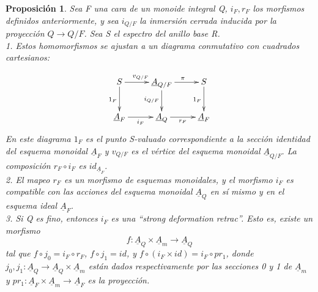 \documentclass[12pt,spanish]{amsart}
\newtheorem{prop}[Theorem]{Proposición}
\theoremstyle{definition}
\theoremstyle{remark}
\begin{document}
\begin{prop}
Sea F una cara de un monoide \textit{integral} Q, $i_{F},r_{F}$ los morfismos definidos anteriormente, y sea $i_{Q/F}$ la inmersión cerrada inducida por la proyección $Q \to Q/F$. Sea S el espectro del anillo base R. \\
1. Estos homomorfismos se ajustan a un diagrama conmutativo con cuadrados cartesianos: 

$$\xymatrix{
S \ar[d]_{1_{F}} \ar[r]^{v_{Q/F}} & \underline{A}_{Q/F} \ar[d]_{i_{Q/F}} \ar[r]^{\pi} & S \ar[d]_{1_{F}} \\
\underline{A}_{F} \ar[r]_{i_{F}} & \underline{A}_{Q} \ar[r]_{r_{F}} & \underline{A}_{F}
}
$$
En este diagrama $1_{F}$ es el punto S-valuado correspondiente a la sección identidad del esquema monoidal $\underline{A}_{F}$ y $v_{Q/F}$ es el vértice del esquema monoidal $\underline{A}_{Q/F}.$
La composición $r_{F} \circ i_{F}$ es $id_{\underline{A}_{F}}$. \\
2. El mapeo $r_{F}$ es un morfismo de esquemas monoidales, y el morfismo $i_{F}$ es compatible con las acciones del esquema monoidal $\underline{A}_{Q}$ en sí mismo y en el esquema ideal $\underline{A}_{F}$. \\ 
3. Si Q es fino, entonces $i_{F}$ es una ``strong deformation retrac''. Esto es, existe un morfismo 
$$f:\underline{A}_{Q} \times \underline{A}_{m} \to \underline{A}_{Q}$$
tal que $f \circ j_{0}=i_{F} \circ r_{F}$, $f\circ j_{1}=id$, y $f \circ (i_{F}\times id)= i_{F}\circ pr_{1}$, donde $j_{0},j_{1}:\underline{A}_{Q} \to \underline{A}_{Q}\times \underline{A}_{m}$ están dados respectivamente por las secciones 0 y 1 de $\underline{A}_{m}$  y $pr_{1}: \underline{A}_{F}\times \underline{A}_{m} \to \underline{A}_{F}$ es la proyección. 
\end{prop}
\end{document}
